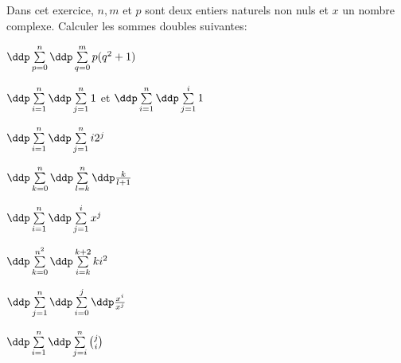 
\begin{exercice}  \; 
Dans cet exercice, $n, m$ et $p$ sont deux entiers naturels non nuls et $x$ un nombre complexe. Calculer les sommes doubles suivantes:
\begin{enumerate}
\begin{minipage}[t]{0.3\textwidth}
\item $\ddp \sum\limits_{p=0}^{n} \ddp \sum\limits_{q=0}^{m} p(q^2+1)$
\item $\ddp \sum\limits_{i=1}^n\ddp \sum\limits_{j=1}^n 1$ \; et \; $\ddp \sum\limits_{i=1}^n\ddp \sum\limits_{j=1}^i 1$
\item $\ddp \sum\limits_{i=1}^n\ddp \sum\limits_{j=1}^n i2^j$
\end{minipage}
\begin{minipage}[t]{0.3\textwidth}
\item $\ddp \sum\limits_{k=0}^n\ddp \sum\limits_{l=k}^n \ddp\frac{k}{l+1}$
\item  $\ddp \sum\limits_{i=1}^n\ddp \sum\limits_{j=1}^i x^j$
\item  $\ddp \sum\limits_{k=0}^{n^2}\ddp \sum\limits_{i=k}^{k+2} ki^2$
\end{minipage}
\begin{minipage}[t]{0.3\textwidth}
\item  $\ddp \sum\limits_{j=1}^n\ddp \sum\limits_{i=0}^j \ddp\frac{ x^{i} }{  x^j }$
\item  $\ddp \sum\limits_{i=1}^n\ddp \sum\limits_{j=i}^n \binom{j}{i}$
\end{minipage}
 \end{enumerate}
\end{exercice}